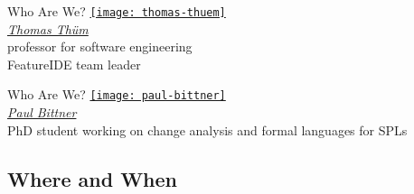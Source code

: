 \begin{frame}{\myframetitle}
	\begin{mycolumns}[animation=none]
		\begin{note}{Who Are We?}
			\centering
			\href{https://www.uni-ulm.de/en/in/sp/team/thuem/}{\texttt{[image: thomas-thuem]}}\\[.5ex]
			\href{https://www.uni-ulm.de/en/in/sp/team/thuem/}{\emph{Thomas Thüm}}\\[.5ex]
			\small professor for software engineering\\[.5ex]
			FeatureIDE team leader
		\end{note}
	\mynextcolumn
		\begin{note}{Who Are We?}
		    \centering
		    \href{https://www.uni-ulm.de/en/in/sp/team/paul-maximilian-bittner/}{\texttt{[image: paul-bittner]}}\\[.5ex]
			\href{https://www.uni-ulm.de/en/in/sp/team/paul-maximilian-bittner/}{\emph{Paul Bittner}}\\[.5ex]
			\small PhD student working on change analysis and formal languages for SPLs\\[.5ex]
		\end{note}
	\end{mycolumns}
\end{frame}

\subsection{Where and When}

